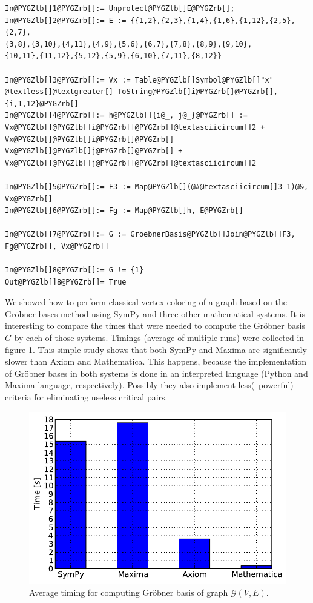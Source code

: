 \begin{Verbatim}[commandchars=@\[\]]
In@PYGZlb[]1@PYGZrb[]:= Unprotect@PYGZlb[]E@PYGZrb[];
In@PYGZlb[]2@PYGZrb[]:= E := {{1,2},{2,3},{1,4},{1,6},{1,12},{2,5},{2,7},
{3,8},{3,10},{4,11},{4,9},{5,6},{6,7},{7,8},{8,9},{9,10},
{10,11},{11,12},{5,12},{5,9},{6,10},{7,11},{8,12}}

In@PYGZlb[]3@PYGZrb[]:= Vx := Table@PYGZlb[]Symbol@PYGZlb[]"x" @textless[]@textgreater[] ToString@PYGZlb[]i@PYGZrb[]@PYGZrb[], {i,1,12}@PYGZrb[]
In@PYGZlb[]4@PYGZrb[]:= h@PYGZlb[]{i@_, j@_}@PYGZrb[] := Vx@PYGZlb[]@PYGZlb[]i@PYGZrb[]@PYGZrb[]@textasciicircum[]2 + Vx@PYGZlb[]@PYGZlb[]i@PYGZrb[]@PYGZrb[] Vx@PYGZlb[]@PYGZlb[]j@PYGZrb[]@PYGZrb[] + Vx@PYGZlb[]@PYGZlb[]j@PYGZrb[]@PYGZrb[]@textasciicircum[]2

In@PYGZlb[]5@PYGZrb[]:= F3 := Map@PYGZlb[](@#@textasciicircum[]3-1)@&, Vx@PYGZrb[]
In@PYGZlb[]6@PYGZrb[]:= Fg := Map@PYGZlb[]h, E@PYGZrb[]

In@PYGZlb[]7@PYGZrb[]:= G := GroebnerBasis@PYGZlb[]Join@PYGZlb[]F3, Fg@PYGZrb[], Vx@PYGZrb[]

In@PYGZlb[]8@PYGZrb[]:= G != {1}
Out@PYGZlb[]8@PYGZrb[]= True
\end{Verbatim}
\noindent
We showed how to perform classical vertex coloring of a graph based on the Gröbner bases method
using SymPy and three other mathematical systems. It is interesting to compare the times that were
needed to compute the Gröbner basis $G$ by each of those systems. Timings (average of multiple
runs) were collected in figure \ref{fig-groebner-time-compare}. This simple study shows that both
SymPy and Maxima are significantly slower than Axiom and Mathematica. This happens, because the
implementation of Gröbner bases in both systems is done in an interpreted language (Python and
Maxima language, respectively). Possibly they also implement less(--powerful) criteria for eliminating
useless critical pairs.
\begin{figure}[htbp]
\centering

\includegraphics{groebner-time-compare.pdf}
\caption{Average timing for computing Gröbner basis of graph $\mathcal{G}(V, E)$.\label{fig-groebner-time-compare}}\end{figure}


